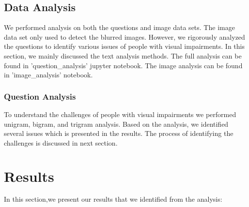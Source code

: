 \documentclass[sigconf]{acmart}
\begin{document}
\subsection{Data Analysis}
We performed analysis on both the questions and image data sets. The image data set only used to detect the blurred images. However, we rigorously analyzed the questions to identify various issues of people with visual impairments. In this section, we mainly discussed the text analysis methods. The full analysis can be found in 'question\_analysis' jupyter notebook. The image analysis can be found in 'image\_analysis' notebook. 

\subsubsection{Question Analysis}
To understand the challenges of people with visual impairments we performed unigram, bigram, and trigram analysis. Based on the analysis, we identified several issues which is presented in the results. The process of identifying the challenges is discussed in next section.



\section{Results}
In this section,we present our results that we identified from the analysis:
\end{document}

